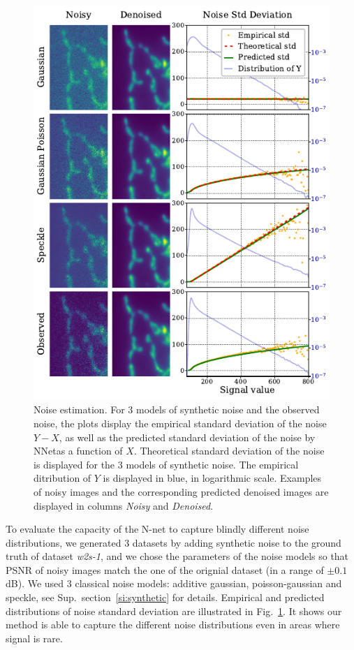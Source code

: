 \documentclass{article}
\begin{document}
\begin{figure}[ht]
\vskip 0.2in
\begin{center}
\centerline{\includegraphics[width=\columnwidth]{fig_noise_std.pdf}}
\caption{Noise estimation.
For 3 models of synthetic noise and the observed noise, the plots display the empirical standard deviation of the noise $Y - X$, as well as the predicted standard deviation of the noise by NNet\footnotemark as a function of $X$.
Theoretical standard deviation of the noise is displayed for the 3 models of synthetic noise.
The empirical ditribution of $Y$ is displayed in blue, in logarithmic scale.
Examples of noisy images and the corresponding predicted denoised images are displayed in columns \textit{Noisy} and \textit{Denoised}.}
\label{fig:noisestd}
\end{center}
\vskip -0.2in
\end{figure}
To evaluate the capacity of the N-net to capture blindly different noise distributions, we generated 3 datasets by adding synthetic noise to the ground truth of dataset \textit{w2s-1}, and we chose the parameters of the noise models so that PSNR of noisy images match the one of the orignial dataset (in a range of $\pm0.1$dB).
We used 3 classical noise models: additive gaussian, poisson-gaussian and speckle, see Sup.~section~\ref{si:synthetic} for details.
Empirical and predicted distributions of noise standard deviation are illustrated in Fig.~\ref{fig:noisestd}.
It shows our method is able to capture the different noise distributions even in areas where signal is rare.
\end{document}
